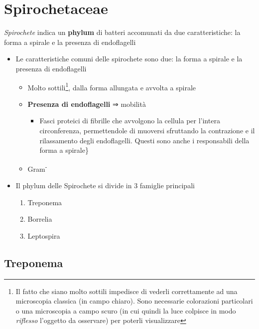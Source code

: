 \documentclass[italian,]{article}
\providecommand{\tightlist}{%
  \setlength{\itemsep}{0pt}\setlength{\parskip}{0pt}}
\begin{document}
\hypertarget{spirochetaceae}{%
\section{Spirochetaceae}\label{spirochetaceae}}

\footnotesize

\emph{Spirochete} indica un \textbf{phylum} di batteri accomunati da due
caratteristiche: la forma a spirale e la presenza di endoflagelli
\normalsize

\begin{itemize}
\tightlist
\item
  Le caratteristiche comuni delle spirochete sono due: la forma a
  spirale e la presenza di endoflagelli

  \begin{itemize}
  \tightlist
  \item
    Molto sottili\footnote{Il fatto che siano molto sottili impedisce di
      vederli correttamente ad una microscopia classica (in campo
      chiaro). Sono necessarie colorazioni particolari o una microscopia
      a campo scuro (in cui quindi la luce colpisce in modo
      \emph{riflesso} l'oggetto da osservare) per poterli visualizzare},
    dalla forma allungata e avvolta a spirale
  \item
    \textbf{Presenza di endoflagelli} ⇒ mobilità

    \begin{itemize}
    \tightlist
    \item
      Fasci proteici di fibrille che avvolgono la cellula per l'intera
      circonferenza, permettendole di muoversi sfruttando la contrazione
      e il rilassamento degli endoflagelli. Questi sono anche i
      responsabili della forma a spirale\}
    \end{itemize}
  \item
    Gram\textsuperscript{-}
  \end{itemize}
\item
  Il phylum delle Spirochete si divide in 3 famiglie principali

  \begin{enumerate}
  \def\labelenumi{\arabic{enumi}.}
  \tightlist
  \item
    Treponema
  \item
    Borrelia
  \item
    Leptospira
  \end{enumerate}
\end{itemize}

\hypertarget{treponema}{%
\subsection{Treponema}\label{treponema}}
\end{document}
